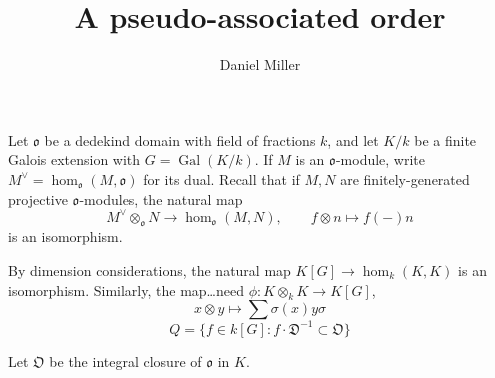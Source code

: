 \documentclass{article}
\title{A pseudo-associated order}
\author{Daniel Miller}
\DeclareMathOperator{\gal}{Gal}
\newcommand{\fo}{\mathfrak{o}}
\newcommand{\fO}{\mathfrak{O}}
\begin{document}
\maketitle





Let $\fo$ be a dedekind domain with field of fractions $k$, and let $K/k$ be a 
finite Galois extension with $G=\gal(K/k)$. If $M$ is an $\fo$-module, write 
$M^\vee=\hom_\fo(M,\fo)$ for its dual. Recall that if $M,N$ are 
finitely-generated projective $\fo$-modules, the natural map 
\[
  M^\vee\otimes_\fo N \to \hom_\fo(M,N) , \qquad f\otimes n\mapsto f(-) n 
\]
is an isomorphism. 

By dimension considerations, the natural map $K[G] \to \hom_k(K,K)$ is an 
isomorphism. Similarly, the map\ldots need $\phi:K\otimes_k K \to K[G]$, 
\[
  x\otimes y \mapsto \sum \sigma(x) y \sigma
\]
\[
  Q = \{f\in k[G]:f\cdot \mathfrak D^{-1}\subset \mathfrak O\}
\]

Let $\fO$ be the integral closure of $\fo$ in $K$. 
\end{document}
